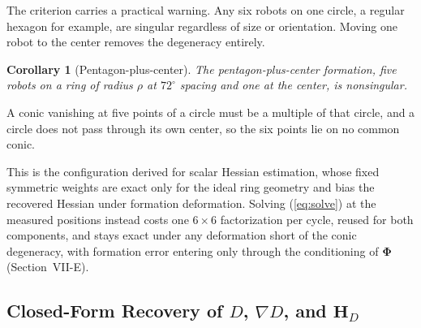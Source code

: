 \documentclass[lettersize,journal]{IEEEtran}
\newtheorem{corollary}{Corollary}
\begin{document}
The criterion carries a practical warning. Any six robots on one circle,
a regular hexagon for example, are singular regardless of size or
orientation. Moving one robot to the center removes the degeneracy
entirely.

\begin{corollary}[Pentagon-plus-center]
\label{cor:pentagon}
The pentagon-plus-center formation, five robots on a ring of radius
$\rho$ at $72^\circ$ spacing and one at the center, is nonsingular.
\end{corollary}

\begin{IEEEproof}
A conic vanishing at five points of a circle must be a multiple of that
circle, and a circle does not pass through its own center, so the six
points lie on no common conic.
\end{IEEEproof}

This is the configuration \cite{6} derived for scalar Hessian
estimation, whose
fixed symmetric weights are exact only for the ideal ring geometry and
bias the recovered Hessian under formation deformation. Solving
(\ref{eq:solve}) at the measured positions instead costs one
$6 \times 6$ factorization per cycle, reused for
both components, and stays exact under any deformation short of the
conic degeneracy, with formation error entering only through the
conditioning of $\boldsymbol{\Phi}$ (Section~\mbox{VII-E}).

\subsection{Closed-Form Recovery of $D$, $\nabla D$, and $\mathbf{H}_D$}
\end{document}
